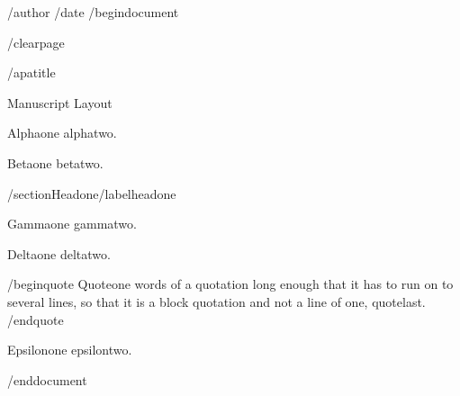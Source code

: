 /author{}
/date{}
/begin{document}


/clearpage

/apatitle{

Manuscript Layout

}

Alphaone alphatwo.

Betaone betatwo.

/section{Headone}/label{headone}

Gammaone gammatwo.

Deltaone deltatwo.

/begin{quote}
Quoteone words of a quotation long enough that it has to run on to
several lines, so that it is a block quotation and not a line of one,
quotelast.
/end{quote}

Epsilonone epsilontwo.




/end{document}
